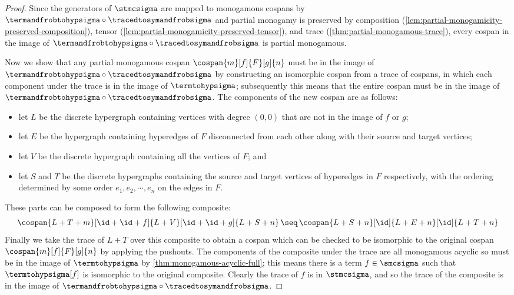\begin{proof}
    Since the generators of \(\stmcsigma\) are mapped to monogamous cospans
    by \(\termandfrobtohypsigma \circ \tracedtosymandfrobsigma\) and partial
    monogamy is preserved by composition
    (\cref{lem:partial-monogamicity-preserved-composition}),
    tensor (\cref{lem:partial-monogamicity-preserved-tensor}),
    and trace
    (\cref{thm:partial-monogamous-trace}),
    every cospan in the image of
    \(\termandfrobtohypsigma \circ \tracedtosymandfrobsigma\) is partial
    monogamous.

    Now we show that any partial monogamous cospan \(
    \cospan{m}[f]{F}[g]{n}
    \) must be in the image of \(
    \termandfrobtohypsigma \circ \tracedtosymandfrobsigma
    \) by constructing an isomorphic cospan from a trace of cospans, in which
    each component under the trace is in the image of \(\termtohypsigma\);
    subsequently this means that the entire cospan must be in the image of
    \(\termandfrobtohypsigma \circ \tracedtosymandfrobsigma\).
    The components of the new cospan are as follows:
    \begin{itemize}
        \item let \(L\) be the discrete hypergraph containing vertices with
              degree
              \((0,0)\) that are not in the image of \(f\) or \(g\);
        \item let \(E\) be the hypergraph containing hyperedges of \(F\)
              disconnected from each other along with their source and target
              vertices;
        \item let \(V\) be the discrete hypergraph containing all the
              vertices of \(F\); and
        \item let \(S\) and \(T\) be the discrete hypergraphs containing
              the source and target vertices of hyperedges in \(F\)
              respectively, with the ordering determined by some order
              \(e_1,e_2,\cdots,e_n\) on the edges in \(F\).
    \end{itemize}
    These parts can be composed to form the following composite:
    \begin{gather*}
        \cospan{L + T + m}[\id + \id + f]{L + V}[\id + \id + g]{L + S + n}
        \,\seq\,
        \cospan{L + S + n}[\id]{L + E + n}[\id]{L + T + n}
    \end{gather*}
    Finally we take the trace of \(L + T\) over this composite to obtain a
    cospan which can be checked to be isomorphic to the original cospan
    \(\cospan{m}[f]{F}[g]{n}\) by applying the pushouts.
    The components of the composite under the trace are all monogamous acyclic
    so must be in the image of \(\termtohypsigma\) by
    \cref{thm:monogamous-acyclic-full}; this means there is a term
    \(f \in \smcsigma\) such that \(\termtohypsigma[f]\) is isomorphic to the
    original composite.
    Clearly the trace of \(f\) is in \(\stmcsigma\), and so the trace of the
    composite is in the image of
    \(\termandfrobtohypsigma \circ \tracedtosymandfrobsigma\).
\end{proof}

